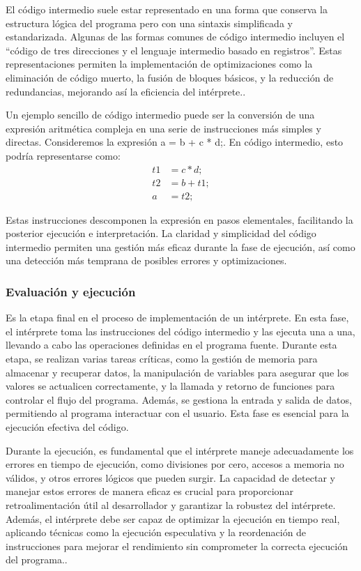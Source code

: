 El código intermedio suele estar representado en una forma que conserva la estructura lógica del programa pero con una sintaxis simplificada y estandarizada. Algunas de las formas comunes de código intermedio incluyen el “código de tres direcciones y el lenguaje intermedio basado en registros”. Estas representaciones permiten la implementación de optimizaciones como la eliminación de código muerto, la fusión de bloques básicos, y la reducción de redundancias, mejorando así la eficiencia del intérprete.. \parencite{Jeffery2021}

Un ejemplo sencillo de código intermedio puede ser la conversión de una expresión aritmética compleja en una serie de instrucciones más simples y directas. Consideremos la expresión a = b + c * d;. En código intermedio, esto podría representarse como:
\begin{equation*}
  \begin{split}
    t1 & = c * d; \\
    t2 & = b + t1; \\
    a & = t2;
  \end{split}
\end{equation*}

Estas instrucciones descomponen la expresión en pasos elementales, facilitando la posterior ejecución e interpretación. La claridad y simplicidad del código intermedio permiten una gestión más eficaz durante la fase de ejecución, así como una detección más temprana de posibles errores y optimizaciones.

\subsubsection{Evaluación y ejecución}
Es la etapa final en el proceso de implementación de un intérprete. En esta fase, el intérprete toma las instrucciones del código intermedio y las ejecuta una a una, llevando a cabo las operaciones definidas en el programa fuente. Durante esta etapa, se realizan varias tareas críticas, como la gestión de memoria para almacenar y recuperar datos, la manipulación de variables para asegurar que los valores se actualicen correctamente, y la llamada y retorno de funciones para controlar el flujo del programa. Además, se gestiona la entrada y salida de datos, permitiendo al programa interactuar con el usuario. Esta fase es esencial para la ejecución efectiva del código.

Durante la ejecución, es fundamental que el intérprete maneje adecuadamente los errores en tiempo de ejecución, como divisiones por cero, accesos a memoria no válidos, y otros errores lógicos que pueden surgir. La capacidad de detectar y manejar estos errores de manera eficaz es crucial para proporcionar retroalimentación útil al desarrollador y garantizar la robustez del intérprete. Además, el intérprete debe ser capaz de optimizar la ejecución en tiempo real, aplicando técnicas como la ejecución especulativa y la reordenación de instrucciones para mejorar el rendimiento sin comprometer la correcta ejecución del programa.. \parencite{Jeffery2021}

